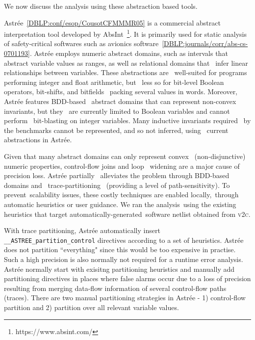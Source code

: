 We now discuss the analysis using these abstraction based tools.

%
Astr{\'e}e~\ref{DBLP:conf/esop/CousotCFMMMR05} is a commercial abstract 
interpretation tool developed by AbsInt~\footnote{https://www.absint.com/}.  
It is primarily used for static analysis of safety-critical softwares 
such as avionics software~\ref{DBLP:journals/corr/abs-cs-0701193}.
Astr{\'e}e employs numeric abstract domains, such as intervals that  
abstract variable values as ranges, as well as relational domains that  
infer linear relationships between variables. These abstractions are  
well-suited for programs performing integer and float arithmetic, but  
less so for bit-level Boolean operators, bit-shifts, and bitfields  
packing several values in words. Moreover, Astr{\'e}e features BDD-based  
abstract domains that can represent non-convex invariants, but they  
are currently limited to Boolean variables and cannot perform  
bit-blasting on integer variables.  Many inductive invariants required  
by the benchmarks cannot be represented, and so not inferred, using 
current abstractions in Astr{\'e}e.


%
%
Given that many abstract domains can only represent convex  
(non-disjunctive) numeric properties, control-flow joins and loop  
widening are a major cause of precision loss.  Astr{\'e}e partially  
alleviates the problem through BDD-based domains and 
trace-partitioning~\cite{DBLP:journals/toplas/RivalM07}
(providing a level of path-sensitivity). To prevent scalability issues, 
these costly techniques are enabled locally, through automatic heuristics 
or user guidance. We ran the analysis using the existing heuristics that 
target automatically-generated software netlist obtained from \textsc{v2c}. 


With trace partitioning, Astr{\'e}e automatically insert 
\texttt{\_\_ASTREE\_partition\_control} directives according to a set of 
heuristics.  Astr{\'e}e does not partition ``everything" since this would 
be too expensive in practise. Such a high precision is also normally not 
required for a runtime error analysis. Astr{\'e}e normally start with exisitng 
partitioning heuristics and manually add partitioning directives in places 
where false alarms occur due to a loss of precision resulting from merging 
data-flow information of several control-flow paths (traces).
There are two manual partitioning strategies in Astr{\'e}e - 
1) control-flow partition and 2) partition over all relevant variable values.


